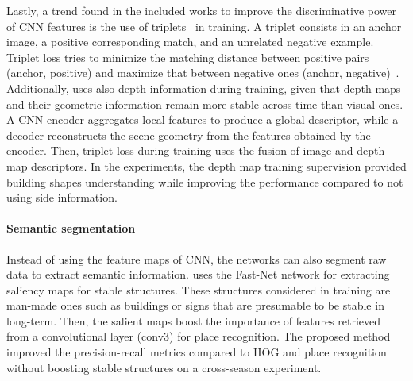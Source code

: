 Lastly, a trend found in the included works to improve the discriminative power of CNN features is the use of triplets~\parencite{martini-et-al:2020:s20216002,liu-et-al:2021:9561126,piasco-et-al:2021:6,sun-et-al:2021:9635886,yin-et-al:2021:3061375,yin-et-al:2021:661199} in training.
A triplet consists in an anchor image, a positive corresponding match, and an unrelated negative example. Triplet loss tries to minimize the matching distance between positive pairs (anchor, positive) and maximize that between negative ones (anchor, negative)~\parencite{sun-et-al:2021:9635886}.
Additionally, \cite{piasco-et-al:2021:6} uses also depth information during training, given that depth maps and their geometric information remain more stable across time than visual ones. A CNN encoder aggregates local features to produce a global descriptor, while a decoder reconstructs the scene geometry from the features obtained by the encoder. Then, triplet loss during training uses the fusion of image and depth map descriptors. In the experiments, the depth map training supervision provided building shapes understanding while improving the performance compared to not using side information.

\paragraph{Semantic segmentation}

Instead of using the feature maps of CNN, the networks can also segment raw data to extract semantic information.
\cite{naseer-et-al:2017:7989305} uses the Fast-Net network for extracting saliency maps for stable structures. These structures considered in training are man-made ones such as buildings or signs that are presumable to be stable in long-term. Then, the salient maps boost the importance of features retrieved from a convolutional layer (conv3) for place recognition. The proposed method improved the precision-recall metrics compared to HOG and place recognition without boosting stable structures on a cross-season experiment.


